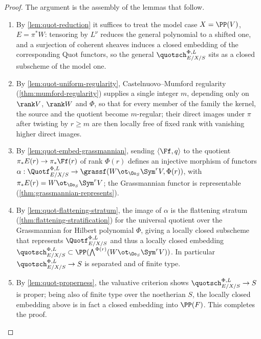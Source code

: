 \begin{proof}
  The argument is the assembly of the lemmas that follow.
  \begin{enumerate}
    \item By \cref{lem:quot-reduction} it suffices to treat the model case
      $X = \PP(V)$, $E = \pi^* W$: tensoring by $L^\nu$ reduces the general
      polynomial to a shifted one, and a surjection of coherent sheaves induces
      a closed embedding of the corresponding Quot functors, so the general
      $\quotsch_{E/X/S}^{\Phi,L}$ sits as a closed subscheme of the model one.
    \item By \cref{lem:quot-uniform-regularity}, Castelnuovo--Mumford regularity
      (\cref{thm:mumford-regularity}) supplies a single integer $m$, depending
      only on $\rank V$, $\rank W$ and $\Phi$, so that for every member of the
      family the kernel, the source and the quotient become $m$-regular; their
      direct images under $\pi$ after twisting by $r \ge m$ are then locally
      free of fixed rank with vanishing higher direct images.
    \item By \cref{lem:quot-embed-grassmannian}, sending
      $\langle \Ff, q\rangle$ to the quotient
      $\pi_* E(r) \to \pi_* \Ff(r)$ of rank $\Phi(r)$ defines an injective
      morphism of functors
      $\alpha : \Quotf_{E/X/S}^{\Phi,L} \to \grassf(W \ot_{\Oo_S} \Sym^r V, \Phi(r))$,
      with $\pi_* E(r) = W \ot_{\Oo_S} \Sym^r V$; the Grassmannian functor is
      representable (\cref{thm:grassmannian-represents}).
    \item By \cref{lem:quot-flattening-stratum}, the image of $\alpha$ is the
      flattening stratum (\cref{thm:flattening-stratification}) for the
      universal quotient over the Grassmannian for Hilbert polynomial $\Phi$,
      giving a locally closed subscheme that represents
      $\Quotf_{E/X/S}^{\Phi,L}$ and thus a locally closed embedding
      $\quotsch_{E/X/S}^{\Phi,L} \subset \PP(\bigwedge^{\Phi(r)}(W \ot_{\Oo_S}\Sym^r V))$.
      In particular $\quotsch_{E/X/S}^{\Phi,L} \to S$ is separated and of finite
      type.
    \item By \cref{lem:quot-properness}, the valuative criterion shows
      $\quotsch_{E/X/S}^{\Phi,L} \to S$ is proper; being also of finite type over
      the noetherian $S$, the locally closed embedding above is in fact a closed
      embedding into $\PP(F)$. This completes the proof.\qedhere
  \end{enumerate}
\end{proof}

